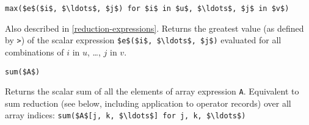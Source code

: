 \begin{operatordefinition*}[max]\label{modelica:max-reduction}
\begin{synopsis}\begin{lstlisting}
max($e$($i$, $\ldots$, $j$) for $i$ in $u$, $\ldots$, $j$ in $v$)
\end{lstlisting}\end{synopsis}
\begin{semantics}
Also described in \cref{reduction-expressions}.  Returns the greatest value (as defined by \lstinline!>!) of the scalar expression \lstinline!$e$($i$, $\ldots$, $j$)! evaluated for all combinations of $i$ in $u$, \ldots, $j$ in $v$.
\end{semantics}
\end{operatordefinition*}

\begin{operatordefinition*}[sum]\label{modelica:sum-of-array}
\begin{synopsis}\begin{lstlisting}
sum($A$)
\end{lstlisting}\end{synopsis}
\begin{semantics}
Returns the scalar sum of all the elements of array expression \lstinline!A!.  Equivalent to sum reduction (see below, including application to operator records) over all array indices: \lstinline!sum($A$[j, k, $\ldots$] for j, k, $\ldots$)!
\end{semantics}
\end{operatordefinition*}

